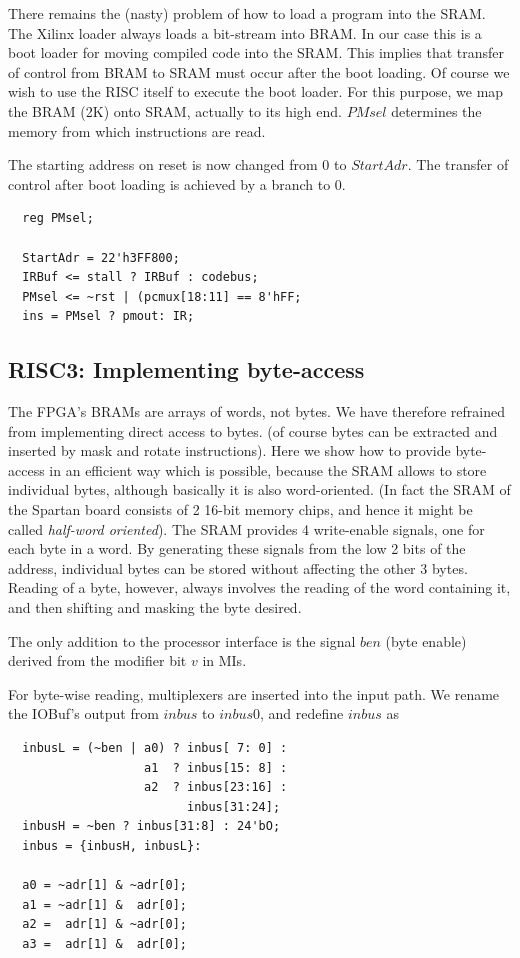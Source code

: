 There remains the (nasty) problem of how to load a program into the SRAM. The Xilinx loader always
loads a bit-stream into BRAM. In our case this is a boot loader for moving compiled code into the
SRAM. This implies that transfer of control from BRAM to SRAM must occur after the boot loading.
Of course we wish to use the RISC itself to execute the boot loader. For this purpose, we map the
BRAM (2K) onto SRAM, actually to its high end. $PMsel$ determines the memory from which instructions
are read.

The starting address on reset is now changed from 0 to $StartAdr$. The transfer of control after
boot loading is achieved by a branch to 0.
\begin{verbatim}
  reg PMsel;
 
  StartAdr = 22'h3FF800;
  IRBuf <= stall ? IRBuf : codebus;
  PMsel <= ~rst | (pcmux[18:11] == 8'hFF;
  ins = PMsel ? pmout: IR;
\end{verbatim}

\subsection{RISC3: Implementing byte-access}
The FPGA’s BRAMs are arrays of words, not bytes. We have therefore refrained from implementing
direct access to bytes. (of course bytes can be extracted and inserted by mask and rotate
instructions). Here we show how to provide byte-access in an efficient way which is possible,
because the SRAM allows to store individual bytes, although basically it is also word-oriented.
(In fact the SRAM of the Spartan board consists of 2 16-bit memory chips, and hence it might be
called \emph{half-word oriented}). The SRAM provides 4 write-enable signals, one for each byte in
a word. By generating these signals from the low 2 bits of the address, individual bytes can be
stored without affecting the other 3 bytes. Reading of a byte, however, always involves the reading
of the word containing it, and then shifting and masking the byte desired.

The only addition to the processor interface is the signal $ben$ (byte enable) derived from the
modifier bit $v$ in MIs.

For byte-wise reading, multiplexers are inserted into the input path. We rename the IOBuf’s output
from $inbus$ to $inbus0$, and redefine $inbus$ as
\begin{verbatim}
  inbusL = (~ben | a0) ? inbus[ 7: 0] :
                   a1  ? inbus[15: 8] :
                   a2  ? inbus[23:16] :
                         inbus[31:24];
  inbusH = ~ben ? inbus[31:8] : 24'bO;
  inbus = {inbusH, inbusL}:
 
  a0 = ~adr[1] & ~adr[0];
  a1 = ~adr[1] &  adr[0];
  a2 =  adr[1] & ~adr[0];
  a3 =  adr[1] &  adr[0];
\end{verbatim}

